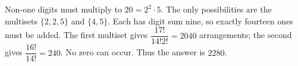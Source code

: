 Non-one digits must multiply to $20=2^2\cdot5$. The only possibilities are the multisets $\{2,2,5\}$ and $\{4,5\}$. Each has digit sum nine, so exactly fourteen ones must be added. The first multiset gives $\dfrac{17!}{14!2!}=2040$ arrangements; the second gives $\dfrac{16!}{14!}=240$. No zero can occur. Thus the answer is $\boxed{2280}$.
